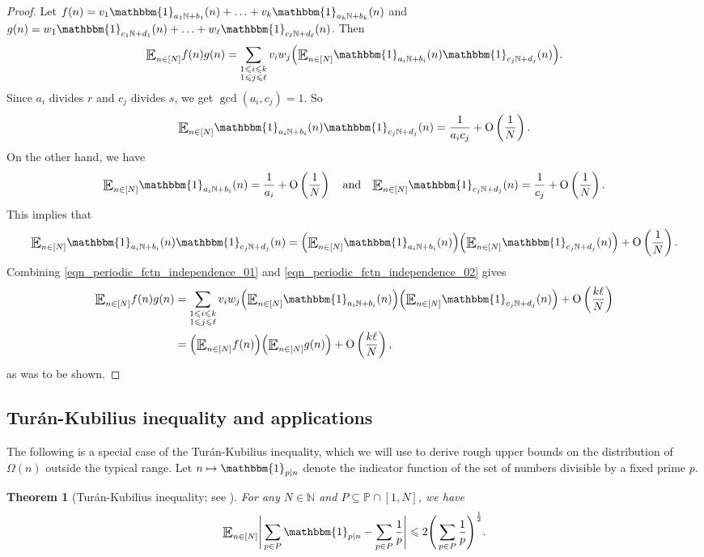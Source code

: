 \documentclass[letter,11pt]{article}
\theoremstyle{plain} %
\newtheorem{theorem}{Theorem}[section]
\theoremstyle{definition} %
\theoremstyle{plain}
\theoremstyle{plain}
\theoremstyle{plain}
\numberwithin{equation}{section}
\newcommand{\Turan}{Tur{\'a}n}
\newcommand{\Oh}{{\mathrm O}}
\newcommand{\N}{\mathbb{N}}
\renewcommand{\leq}{\leqslant}
\renewcommand{\P}{\mathbb{P}}
\renewcommand{\subset}{\subseteq}
\newcommand{\Esub}[1]{\raisebox{-0.4ex}{\scalebox{1.4}[1.3]{$\mathbb{E}$}}\raisebox{-0.35ex}{\ensuremath{_{\scriptstyle #1}}}}
\newcommand{\1}{\mathbbm{1}}
\begin{document}
\begin{proof}
Let  
$f(n)=v_1 \1_{a_1\N+b_1}(n)+\ldots+v_k \1_{a_k\N+b_k}(n)$ and $g(n)=w_1 \1_{c_1\N+d_1}(n)+\ldots+w_\ell \1_{c_\ell\N+d_\ell}(n)$.
Then
\begin{align}
\label{eqn_periodic_fctn_independence_01}
\Esub{n\in[N]} f(n)g(n)
= \sum_{\substack{1\leq i \leq k\\ 1\leq j \leq \ell}} v_i w_j \Big(\Esub{n\in[N]} \1_{a_i\N+b_i}(n)\1_{c_j\N+d_j}(n)\Big).
\end{align}
Since $a_i$ divides $r$ and $c_j$ divides $s$, we get $\gcd(a_i,c_j)=1$. So 
$$\Esub{n\in[N]} \1_{a_i\N+b_i}(n)\1_{c_j\N+d_j}(n)= \frac{1}{a_i c_j} + \Oh\left(\frac{1}{N}\right).$$ 
On the other hand, we have 
$$\Esub{n\in[N]} \1_{a_i\N+b_i}(n) = \frac{1}{a_i}+\Oh\left(\frac{1}{N}\right)
\quad\text{and}\quad
\Esub{n\in[N]} \1_{c_j\N+d_j}(n) = \frac{1}{c_j} + \Oh\left(\frac{1}{N}\right).$$
This implies that
\begin{align}\label{eqn_periodic_fctn_independence_02}
\Esub{n\in[N]} \1_{a_i\N+b_i}(n)\1_{c_j\N+d_j}(n)
= \Big(\Esub{n\in[N]} \1_{a_i\N+b_i}(n)\Big)\Big(\Esub{n\in[N]} \1_{c_j\N+d_j}(n)\Big) +\Oh\left(\frac{1}{N}\right).
\end{align}
Combining \eqref{eqn_periodic_fctn_independence_01} and \eqref{eqn_periodic_fctn_independence_02} gives
\begin{align*}\label{eqn_periodic_fctn_independence_03}
\Esub{n\in[N]} f(n)g(n)
&=
\sum_{\substack{1\leq i \leq k\\ 1\leq j \leq \ell}} v_i w_j \Big(\Esub{n\in[N]} \1_{a_i\N+b_i}(n)\Big)\Big(\Esub{n\in[N]} \1_{c_j\N+d_j}(n)\Big) +\Oh\left(\frac{k\ell}{N}\right)
\\
&=
\Big(\Esub{n\in[N]} f(n)\Big)\Big(\Esub{n\in[N]} g(n)\Big)+\Oh\left(\frac{k\ell}{N}\right),
\end{align*}
as was to be shown. 
\end{proof}


\subsection{\Turan{}-Kubilius inequality and applications}

The following is a special case of the \Turan{}-Kubilius inequality, which we will use to derive rough upper bounds on the distribution of $\Omega(n)$ outside the typical range. Let $n\mapsto \1_{p\mid n}$ denote the indicator function of the set of numbers divisible by a fixed prime $p$.

\begin{theorem}[\Turan{}-Kubilius inequality; see \cite{elliott_TK}]{}
\label{nam_turan_kubilius}
For any $N\in\N$ and $P\subset\P\cap [1,N]$, we have
\begin{equation}
\label{eqn_turan}
\Esub{n\in[N]}\Bigg|\sum_{p\in P}\1_{p\mid n}-\sum_{p\in P}\frac{1}{p}\Bigg| \leq2\Bigg(\sum_{p\in P}\frac{1}{p}\Bigg)^{\frac{1}{2}}.
\end{equation}
\end{theorem}
\end{document}
